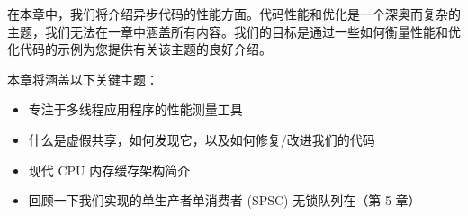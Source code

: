 在本章中，我们将介绍异步代码的性能方面。代码性能和优化是一个深奥而复杂的主题，我们无法在一章中涵盖所有内容。我们的目标是通过一些如何衡量性能和优化代码的示例为您提供有关该主题的良好介绍。

本章将涵盖以下关键主题：

\begin{itemize}
\item
专注于多线程应用程序的性能测量工具

\item
什么是虚假共享，如何发现它，以及如何修复/改进我们的代码

\item
现代 CPU 内存缓存架构简介

\item
回顾一下我们实现的单生产者单消费者 (SPSC) 无锁队列在（第 5 章）
\end{itemize}